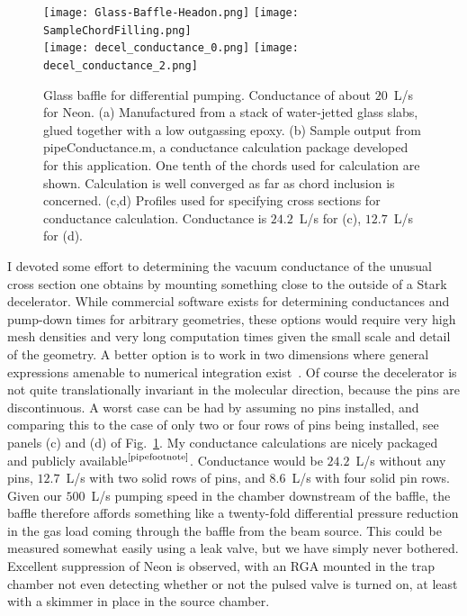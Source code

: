 \begin{figure}[t!]
\centering
\texttt{[image: Glass-Baffle-Headon.png]}
\texttt{[image: SampleChordFilling.png]}\\
\texttt{[image: decel\_conductance\_0.png]}
\texttt{[image: decel\_conductance\_2.png]}
\caption[Glass Baffle for Differential Pumping]{\label{glassbaffleimage}
Glass baffle for differential pumping. Conductance of about $20$~L/s for Neon. (a) Manufactured from a stack of water-jetted glass slabs, glued together with a low outgassing epoxy. (b) Sample output from pipeConductance.m, a conductance calculation package developed for this application\footnotemark. One tenth of the chords used for calculation are shown. Calculation is well converged as far as chord inclusion is concerned. (c,d) Profiles used for specifying cross sections for conductance calculation. Conductance is $24.2$~L/s for (c), $12.7$~L/s for (d).}
\end{figure}

I devoted some effort to determining the vacuum conductance of the unusual cross section one obtains by mounting something close to the outside of a Stark decelerator.
While commercial software exists for determining conductances and pump-down times for arbitrary geometries, these options would require very high mesh densities and very long computation times given the small scale and detail of the geometry.
A better option is to work in two dimensions where general expressions amenable to numerical integration exist~\citep[Eq.~14]{Steckelmacher1966}.
Of course the decelerator is not quite translationally invariant in the molecular direction, because the pins are discontinuous.
A worst case can be had by assuming no pins installed, and comparing this to the case of only two or four rows of pins being installed, see panels (c) and (d) of Fig.~\ref{glassbaffleimage}.
My conductance calculations are nicely packaged and publicly available$^{\text{\ref{pipefootnote}}}$.
Conductance would be $24.2$~L/s without any pins, $12.7$~L/s with two solid rows of pins, and $8.6$~L/s with four solid pin rows.
Given our $500$~L/s pumping speed in the chamber downstream of the baffle, the baffle therefore affords something like a twenty-fold differential pressure reduction in the gas load coming through the baffle from the beam source.
This could be measured somewhat easily using a leak valve, but we have simply never bothered.
Excellent suppression of Neon is observed, with an RGA mounted in the trap chamber not even detecting whether or not the pulsed valve is turned on, at least with a skimmer in place in the source chamber.


\ifx\justbeingincluded\undefined

\fi
